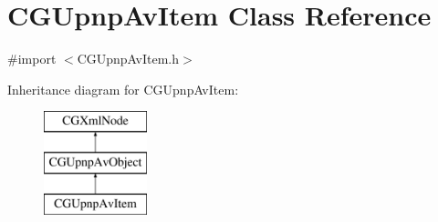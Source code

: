 \hypertarget{interface_c_g_upnp_av_item}{\section{C\-G\-Upnp\-Av\-Item Class Reference}
\label{interface_c_g_upnp_av_item}
}


{\ttfamily \#import $<$C\-G\-Upnp\-Av\-Item.\-h$>$}

Inheritance diagram for C\-G\-Upnp\-Av\-Item\-:\begin{figure}[H]
\begin{center}
\leavevmode
\includegraphics[height=3.000000cm]{interface_c_g_upnp_av_item}
\end{center}
\end{figure}

